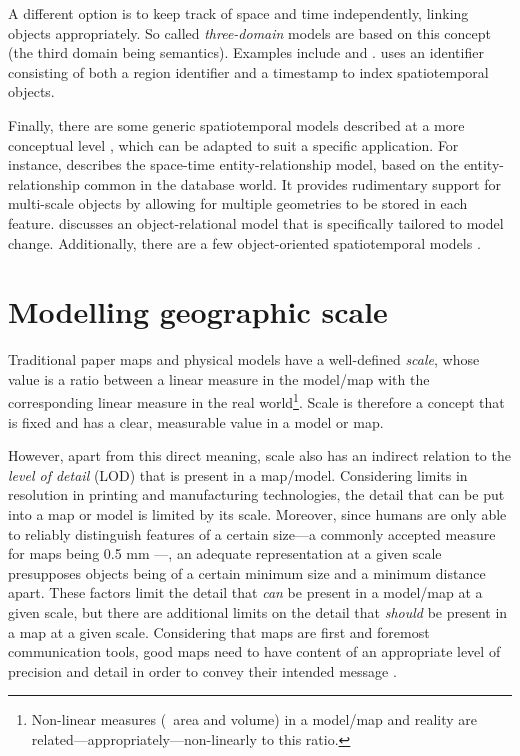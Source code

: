 A different option is to keep track of space and time independently, linking objects appropriately.
So called \emph{three-domain} models are based on this concept (the third domain being semantics).
Examples include \citet{Yuan94} and \citet{Claramunt95}.
\citet{vanOosterom97} uses an identifier consisting of both a region identifier and a timestamp to index spatiotemporal objects.

Finally, there are some generic spatiotemporal models described at a more conceptual level \citep{Story95}, which can be adapted to suit a specific application.
For instance, \citet{Tryfona99} describes the space-time entity-relationship model, based on the entity-relationship \citep{Chen76} common in the database world.
It provides rudimentary support for multi-scale objects by allowing for multiple geometries to be stored in each feature.
\citet{Claramunt99} discusses an object-relational model that is specifically tailored to model change.
Additionally, there are a few object-oriented spatiotemporal models \citep{Worboys90}.

\section{Modelling geographic scale}
\label{se:modelling-scale}

Traditional paper maps and physical models have a well-defined \emph{scale}, whose value is a ratio between a linear measure in the model/map with the corresponding linear measure in the real world\footnote{Non-linear measures (\eg\ area and volume) in a model/map and reality are related---appropriately---non-linearly to this ratio.}.
Scale is therefore a concept that is fixed and has a clear, measurable value in a model or map.

However, apart from this direct meaning, scale also has an indirect relation to the \emph{level of detail} (LOD) that is present in a map/model.
Considering limits in resolution in printing and manufacturing technologies, the detail that can be put into a map or model is limited by its scale.
Moreover, since humans are only able to reliably distinguish features of a certain size---a commonly accepted measure for maps being 0.5 mm \citep{Goodchild01}---, an adequate representation at a given scale presupposes objects being of a certain minimum size and a minimum distance apart.
These factors limit the detail that \emph{can} be present in a model/map at a given scale, but there are additional limits on the detail that \emph{should} be present in a map at a given scale.
Considering that maps are first and foremost communication tools, good maps need to have content of an appropriate level of precision and detail in order to convey their intended message \citep{Hardy12}.

